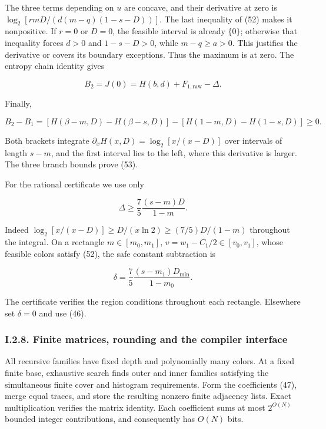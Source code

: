 The three terms depending on \(u\) are concave, and their derivative at zero is \(\log_2[rmD/(d(m-q)(1-s-D))]\). The last inequality of (52) makes it nonpositive. If \(r=0\) or \(D=0\), the feasible interval is already \(\{0\}\); otherwise that inequality forces \(d>0\) and \(1-s-D>0\), while \(m-q\ge a>0\). This justifies the derivative or covers its boundary exceptions. Thus the maximum is at zero. The entropy chain identity gives

\[
B_2=J(0)=H(b,d)+F_{1,\mathrm{raw}}-\Delta.
\]

Finally,

\[
B_2-B_1=
[H(\beta-m,D)-H(\beta-s,D)]
-[H(1-m,D)-H(1-s,D)]\ge0.
\]

Both brackets integrate \(\partial_xH(x,D)=\log_2[x/(x-D)]\) over intervals of length \(s-m\), and the first interval lies to the left, where this derivative is larger. The three branch bounds prove (53).

For the rational certificate we use only

\[
\Delta\ge\frac75\frac{(s-m)D}{1-m}.
\tag{56}
\]

Indeed \(\log_2[x/(x-D)]\ge D/(x\ln2)\ge(7/5)D/(1-m)\) throughout the integral. On a rectangle \(m\in[m_0,m_1]\), \(v=w_1-C_1/2\in[v_0,v_1]\), whose feasible colors satisfy (52), the safe constant subtraction is

\[
\delta=\frac75\frac{(s-m_1)D_{\min}}{1-m_0}.
\tag{57}
\]

The certificate verifies the region conditions throughout each rectangle. Elsewhere set \(\delta=0\) and use (46).

\hypertarget{af-a9ec399514-i.2.8.-finite-matrices-rounding-and-the-compiler-interface}{%
\subsubsection{I.2.8. Finite matrices, rounding and the compiler interface}\label{af-a9ec399514-i.2.8.-finite-matrices-rounding-and-the-compiler-interface}}

All recursive families have fixed depth and polynomially many colors. At a fixed finite base, exhaustive search finds outer and inner families satisfying the simultaneous finite cover and histogram requirements. Form the coefficients (47), merge equal traces, and store the resulting nonzero finite adjacency lists. Exact multiplication verifies the matrix identity. Each coefficient sums at most \(2^{O(N)}\) bounded integer contributions, and consequently has \(O(N)\) bits.

